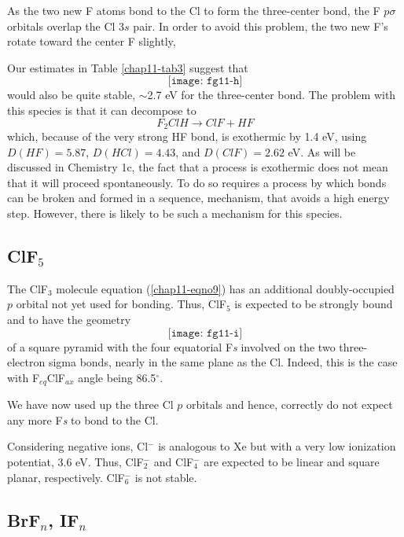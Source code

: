 As the two new F atoms bond to the Cl to form the three-center bond, the F 
$p \sigma$ orbitals overlap the Cl $3s$ pair.  In order to avoid this 
problem, the two new F's rotate toward the center F slightly,

Our estimates in Table \ref{chap11-tab3} suggest that
\begin{equation}
\texttt{[image: fg11-h]}
\label{chap11-eqno12}
\end{equation}
would also be quite stable, $\sim$2.7 eV for the three-center bond. The problem 
with this species is that it can decompose to
\begin{equation}
F_2 ClH \longrightarrow ClF + HF
\end{equation}
which, because of the very strong HF bond, is exothermic by 1.4 eV, 
using $D(HF) = 5.87$, $D(HCl) = 4.43$, and $D(ClF) = 2.62$ eV.  
As will be discussed in Chemistry 1c, the fact that a process is 
exothermic does not mean that it will proceed spontaneously.  To do 
so requires a process by which bonds can be broken and formed in a 
sequence, mechanism, that avoids a high energy step.
However, there is likely to be such a mechanism for this species. 

\subsection{ClF$_5$}

The ClF$_3$ molecule equation (\ref{chap11-eqno9}) has an additional
doubly-occupied $p$ orbital not yet used for bonding.  Thus, ClF$_5$
is expected to be strongly bound and to have the geometry
\begin{equation}
\texttt{[image: fg11-i]}
\label{chap11-eqno13}
\end{equation}
of a square pyramid with the four equatorial F{\it s} involved on the two 
three-electron sigma bonds, nearly in the same plane as the Cl. Indeed, 
this is the case with F$_{eq}$ClF$_{ax}$ angle being 86.5$^{\circ}$.

We have now used up the three Cl $p$ orbitals and hence, correctly do not 
expect any more F{\it s} to bond to the Cl.

Considering negative ions, Cl$^-$ is analogous to Xe but with a very low 
ionization potentiat, 3.6 eV.  Thus, ClF$^-_2$ and ClF$^-_4$ are expected 
to be linear and square planar, respectively.  ClF$^-_6$ is not stable.

\subsection{BrF$_n$, IF$_n$}

